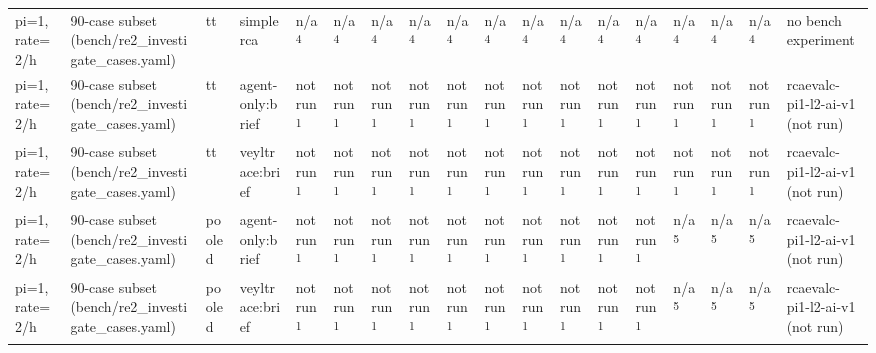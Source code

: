 \begin{table}[t]
\begin{tabular}{llllllllllllllllll}
pi=1, rate=2/h & 90-case subset (bench/re2\_investigate\_cases.yaml) & tt & simplerca & n/a\textsuperscript{4} & n/a\textsuperscript{4} & n/a\textsuperscript{4} & n/a\textsuperscript{4} & n/a\textsuperscript{4} & n/a\textsuperscript{4} & n/a\textsuperscript{4} & n/a\textsuperscript{4} & n/a\textsuperscript{4} & n/a\textsuperscript{4} & n/a\textsuperscript{4} & n/a\textsuperscript{4} & n/a\textsuperscript{4} & no bench experiment \\
pi=1, rate=2/h & 90-case subset (bench/re2\_investigate\_cases.yaml) & tt & agent-only:brief & not run\textsuperscript{1} & not run\textsuperscript{1} & not run\textsuperscript{1} & not run\textsuperscript{1} & not run\textsuperscript{1} & not run\textsuperscript{1} & not run\textsuperscript{1} & not run\textsuperscript{1} & not run\textsuperscript{1} & not run\textsuperscript{1} & not run\textsuperscript{1} & not run\textsuperscript{1} & not run\textsuperscript{1} & rcaevalc-pi1-l2-ai-v1 (not run) \\
pi=1, rate=2/h & 90-case subset (bench/re2\_investigate\_cases.yaml) & tt & veyltrace:brief & not run\textsuperscript{1} & not run\textsuperscript{1} & not run\textsuperscript{1} & not run\textsuperscript{1} & not run\textsuperscript{1} & not run\textsuperscript{1} & not run\textsuperscript{1} & not run\textsuperscript{1} & not run\textsuperscript{1} & not run\textsuperscript{1} & not run\textsuperscript{1} & not run\textsuperscript{1} & not run\textsuperscript{1} & rcaevalc-pi1-l2-ai-v1 (not run) \\
pi=1, rate=2/h & 90-case subset (bench/re2\_investigate\_cases.yaml) & pooled & agent-only:brief & not run\textsuperscript{1} & not run\textsuperscript{1} & not run\textsuperscript{1} & not run\textsuperscript{1} & not run\textsuperscript{1} & not run\textsuperscript{1} & not run\textsuperscript{1} & not run\textsuperscript{1} & not run\textsuperscript{1} & not run\textsuperscript{1} & n/a\textsuperscript{5} & n/a\textsuperscript{5} & n/a\textsuperscript{5} & rcaevalc-pi1-l2-ai-v1 (not run) \\
pi=1, rate=2/h & 90-case subset (bench/re2\_investigate\_cases.yaml) & pooled & veyltrace:brief & not run\textsuperscript{1} & not run\textsuperscript{1} & not run\textsuperscript{1} & not run\textsuperscript{1} & not run\textsuperscript{1} & not run\textsuperscript{1} & not run\textsuperscript{1} & not run\textsuperscript{1} & not run\textsuperscript{1} & not run\textsuperscript{1} & n/a\textsuperscript{5} & n/a\textsuperscript{5} & n/a\textsuperscript{5} & rcaevalc-pi1-l2-ai-v1 (not run) \\

\end{tabular}
\end{table}
